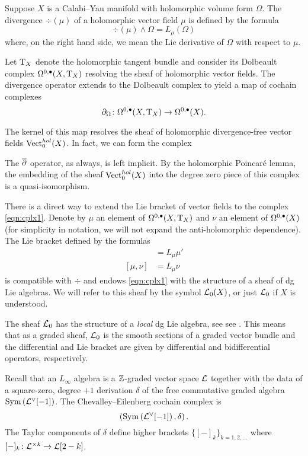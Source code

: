 \documentclass[11pt]{amsart}
\begin{document}
Suppose $X$ is a Calabi--Yau manifold with holomorphic volume form $\Omega$.
The divergence $\div(\mu)$ of a holomorphic vector field $\mu$ is defined by the formula
\[
\div (\mu) \wedge \Omega = L_\mu (\Omega)
\]
where, on the right hand side, we mean the Lie derivative of $\Omega$ with respect to $\mu$.

Let ${\rm T}_X$ denote the holomorphic tangent bundle and consider its Dolbeault complex $\Omega^{0,\bullet}(X , {\rm T}_X)$ resolving the sheaf of holomorphic vector fields. 
The divergence operator extends to the Dolbeault complex to yield a map of cochain complexes 
\[
\partial_{\Omega} \colon \Omega^{0,\bullet}(X , {\rm T}_X) \to \Omega^{0,\bullet}(X) .
\]

The kernel of this map resolves the sheaf of holomorphic divergence-free vector fields ${\rm Vect}_0^{hol}(X)$.
In fact, we can form the complex 
\beqn\label{eqn:cplx1}
\eeqn
The $\overline{\partial}$ operator, as always, is left implicit. 
By the holomorphic Poincar\'e lemma, the embedding of the sheaf ${\rm Vect}^{hol}_0(X)$ into the degree zero piece of this complex is a quasi-isomorphism. 

There is a direct way to extend the Lie bracket of vector fields to the complex \eqref{eqn:cplx1}. 
Denote by $\mu$ an element of $\Omega^{0,\bullet}(X , {\rm T}_X)$ and $\nu$ an element of $\Omega^{0,\bullet}(X)$ (for simplicity in notation, we will not expand the anti-holomorphic dependence). 
The Lie bracket defined by the formulas
\begin{align*}
[\mu, \mu'] & = L_\mu \mu' \\
[\mu, \nu] & = L_\mu \nu 
\end{align*}
is compatible with $\div$ and endows \eqref{eqn:cplx1} with the structure of a sheaf of dg Lie algebras.
We will refer to this sheaf by the symbol $\mathcal L_0(X)$, or just $\mathcal L_0$ if $X$ is understood. 

The sheaf $\mathcal L_0$ has the structure of a {\em local} dg Lie algebra, see see \cite[??]{CG2}.
This means that as a graded sheaf, $\mathcal L_0$ is the smooth sections of a graded vector bundle and the differential and Lie bracket are given by differential and bidifferential operators, respectively.



Recall that an $L_\infty$ algebra is a $\mathbb Z$-graded vector space $\mathcal L$ together with the data of a square-zero, degree $+1$ derivation $\delta$ of the free commutative graded algebra $\operatorname{Sym}\left(\mathcal L^\vee [-1] \right)$. 
The Chevalley--Eilenberg cochain complex is 
\[
\left(\operatorname{Sym}\left(\mathcal L^\vee [-1] \right), \delta\right) .
\]
The Taylor components of $\delta$ define higher brackets $\{[-]_k\}_{k=1,2,\ldots}$ where $[-]_k \colon \mathcal L^{\times k} \to \mathcal L[2-k]$. 
\end{document}
